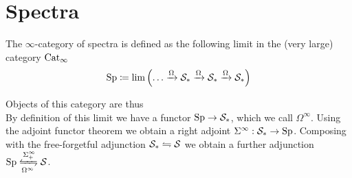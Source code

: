 \section{Spectra}
\begin{defn}
    The $\infty$-category of spectra is defined as the following limit in the (very large) category $\operatorname{Cat}_\infty$
    \begin{equation*}
        \operatorname{Sp}\coloneqq \lim\left( \dots\xrightarrow{\Omega}\mathcal{S}_* \xrightarrow{\Omega} \mathcal{S}_* \xrightarrow{\Omega}\mathcal{S}_* \right)
    \end{equation*}
\end{defn}
Objects of this category are thus \\
By definition of this limit we have a functor $\operatorname{Sp}\rightarrow \mathcal{S}_*$, which we call $\Omega^\infty$.
Using the adjoint functor theorem \cite[5.5.2.9]{lurie2017higher} we obtain a right adjoint 
$\Sigma^\infty: \mathcal{S}_*\rightarrow \operatorname{Sp}$. Composing with the free-forgetful adjunction $\mathcal{S}_* \leftrightharpoons \mathcal{S}$
we obtain a further adjunction $\Sp\xleftrightharpoons[\Omega^\infty]{\sip}\Spc$.